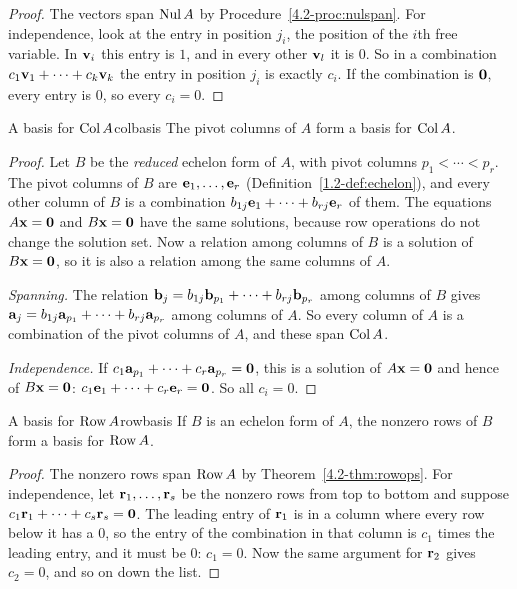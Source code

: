 \documentclass[11pt]{article}
\begin{document}
\begin{proof}
The vectors span $\operatorname{Nul} A$ by Procedure~\ref{4.2-proc:nulspan}. For independence, look at the entry in position $j_i$, the position of the $i$th free variable. In $\mathbf{v}_i$ this entry is $1$, and in every other $\mathbf{v}_l$ it is $0$. So in a combination $c_1\mathbf{v}_1+\cdots+c_k\mathbf{v}_k$ the entry in position $j_i$ is exactly $c_i$. If the combination is $\mathbf{0}$, every entry is $0$, so every $c_i=0$.
\end{proof}

\begin{thm}{A basis for $\operatorname{Col} A$}{colbasis}
The pivot columns of $A$ form a basis for $\operatorname{Col} A$.
\end{thm}

\begin{proof}
Let $B$ be the \emph{reduced} echelon form of $A$, with pivot columns $p_1<\cdots<p_r$. The pivot columns of $B$ are $\mathbf{e}_1,\dots,\mathbf{e}_r$ (Definition~\ref{1.2-def:echelon}), and every other column of $B$ is a combination $b_{1j}\mathbf{e}_1+\cdots+b_{rj}\mathbf{e}_r$ of them. The equations $A\mathbf{x}=\mathbf{0}$ and $B\mathbf{x}=\mathbf{0}$ have the same solutions, because row operations do not change the solution set. Now a relation among columns of $B$ is a solution of $B\mathbf{x}=\mathbf{0}$, so it is also a relation among the same columns of $A$.

\emph{Spanning.} The relation $\mathbf{b}_j=b_{1j}\mathbf{b}_{p_1}+\cdots+b_{rj}\mathbf{b}_{p_r}$ among columns of $B$ gives $\mathbf{a}_j=b_{1j}\mathbf{a}_{p_1}+\cdots+b_{rj}\mathbf{a}_{p_r}$ among columns of $A$. So every column of $A$ is a combination of the pivot columns of $A$, and these span $\operatorname{Col} A$.

\emph{Independence.} If $c_1\mathbf{a}_{p_1}+\cdots+c_r\mathbf{a}_{p_r}=\mathbf{0}$, this is a solution of $A\mathbf{x}=\mathbf{0}$ and hence of $B\mathbf{x}=\mathbf{0}$: $c_1\mathbf{e}_1+\cdots+c_r\mathbf{e}_r=\mathbf{0}$. So all $c_i=0$.
\end{proof}

\begin{thm}{A basis for $\operatorname{Row} A$}{rowbasis}
If $B$ is an echelon form of $A$, the nonzero rows of $B$ form a basis for $\operatorname{Row} A$.
\end{thm}

\begin{proof}
The nonzero rows span $\operatorname{Row} A$ by Theorem~\ref{4.2-thm:rowops}. For independence, let $\mathbf{r}_1,\dots,\mathbf{r}_s$ be the nonzero rows from top to bottom and suppose $c_1\mathbf{r}_1+\cdots+c_s\mathbf{r}_s=\mathbf{0}$. The leading entry of $\mathbf{r}_1$ is in a column where every row below it has a $0$, so the entry of the combination in that column is $c_1$ times the leading entry, and it must be $0$: $c_1=0$. Now the same argument for $\mathbf{r}_2$ gives $c_2=0$, and so on down the list.
\end{proof}
\end{document}
